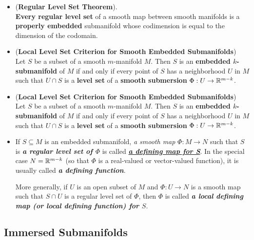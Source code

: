 \documentclass[11pt]{article}
\begin{document}
\begin{itemize}
\item \begin{theorem} (\textbf{Regular Level Set Theorem}).  \citep{lee2003introduction}\\
\textbf{Every regular level set} of a smooth map between smooth manifolds is a \textbf{properly embedded} submanifold whose codimension is equal to the dimension of the codomain.
\end{theorem}

\item \begin{proposition} (\textbf{Local Level Set Criterion for Smooth Embedded Submanifolds})\\
Let $S$ be a subset of a smooth $m$-manifold $M$. Then $S$ is an \textbf{embedded $k$-submanifold} of $M$ if and only if every point of $S$ has a neighborhood
$U$ in $M$ such that $U \cap S$ is a \textbf{level set} of a \textbf{smooth submersion} $\Phi: U \rightarrow {\mathbb R}^{m-k}$.
\end{proposition}

\item \begin{proposition} (\textbf{Local Level Set Criterion for Smooth Embedded Submanifolds})\\
Let $S$ be a subset of a smooth $m$-manifold $M$. Then $S$ is an \textbf{embedded $k$-submanifold} of $M$ if and only if every point of $S$ has a neighborhood
$U$ in $M$ such that $U \cap S$ is a \textbf{level set} of a \textbf{smooth submersion} $\Phi: U \rightarrow {\mathbb R}^{m-k}$.
\end{proposition}

\item \begin{definition}
If $S \subseteq M$ is an embedded submanifold, \emph{a smooth map} $\Phi: M \rightarrow N$ such that $S$ is \emph{\textbf{a regular level set of $\Phi$}} is called \underline{\emph{\textbf{a defining map for S}}}. In the special case $N = {\mathbb R}^{m-k}$ (so that $\Phi$ is a real-valued or vector-valued function), it is usually called \emph{\textbf{a defining function}}. 

More generally, if $U$ is an open subset of $M$ and $\Phi: U \rightarrow N$ is a smooth map such that $S \cap U$ is a regular level set of $\Phi$, then $\Phi$ is called \emph{\textbf{a local defining map (or local defining function) for $S$}}.
\end{definition}
\end{itemize}

\subsection{Immersed Submanifolds}
\end{document}
